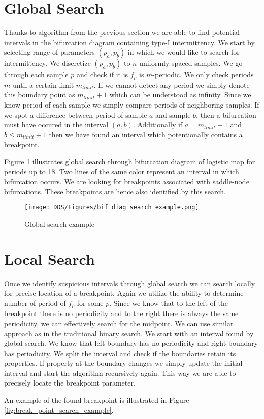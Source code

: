 \section{Global Search}
Thanks to algorithm from the previous section we are able to find potential intervals in the bifurcation diagram containing type-I intermittency.
We start by selecting range of parameters $(p_a, p_b)$ in which we would like to search for intermittency.
We discretize $(p_a, p_b)$ to $n$ uniformly spaced samples.
We go through each sample $p$ and check if it is $f_p$ is $m$-periodic.
We only check periods $m$ until a certain limit $m_{limit}$.
If we cannot detect any period we simply denote this boundary point as $m_{limit}+1$ which can be understood as infinity.
Since we know period of each sample we simply compare periods of neighboring samples.
If we spot a difference between period of sample $a$ and sample $b$, then a bifurcation must have occured in the interval $(a, b)$.
Additionally if $a=m_{limit}+1$ and $b \leq m_{limit}+1$ then we have found an interval which potentionally contains a breakpoint.
\par
Figure \ref{fig:bif_diag_search_example} illustrates global search through bifurcation diagram of logistic map for periods up to 18.
Two lines of the same color represent an interval in which bifurcation occurs.
We are looking for breakpoints associated with saddle-node bifurcations.
These breakpoints are hence also identified by this search.

\begin{figure}[!h]
    \centering
    \texttt{[image: DDS/Figures/bif\_diag\_search\_example.png]}
    \caption{Global search example}
    \label{fig:bif_diag_search_example}
\end{figure}

\section{Local Search}
Once we identify suspicious intervals through global search we can search locally for precise location of a breakpoint.
Again we utilize the ability to determine number of period of $f_p$ for some $p$.
Since we know that to the left of the breakpoint there is no periodicity and to the right there is always the same periodicity, we can effectively search for the midpoint.
We can use similar approach as in the traditional binary search.
We start with an interval found by global search.
We know that left boundary has no periodicity and right boundary has periodicity.
We split the interval and check if the boundaries retain its properties.
If property at the boundary changes we simply update the initial interval and start the algorithm recursively again.
This way we are able to precisely locate the breakpoint parameter.
\par
An example of the found breakpoint is illustrated in Figure \ref{fig:break_point_search_example}.

